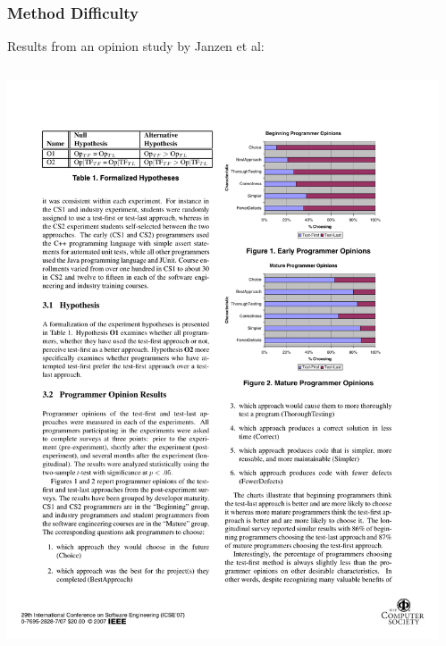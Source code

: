 \documentclass{beamer}
\begin{document}
\begin{frame}
\frametitle{Method Difficulty}
Results from an opinion study by Janzen et al:
\begin{columns}
\begin{column}{.5\textwidth}
\includegraphics[scale=.75]{janzengraph1.pdf}
\\
\end{column}
\begin{column}{.5\textwidth}

\end{column}
\end{columns}
\end{frame}
\end{document}
